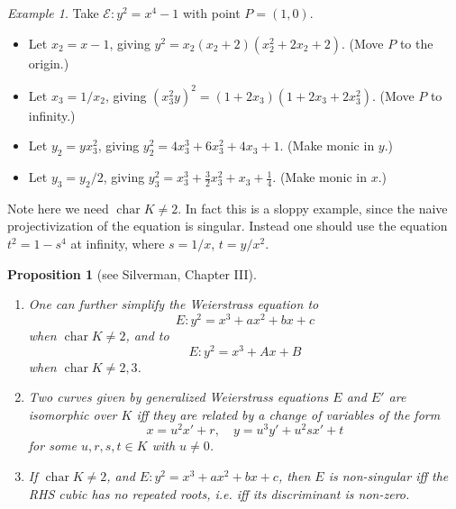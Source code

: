 \documentclass[a4paper]{article}
\theoremstyle{plain}
\newtheorem{proposition}[theorem]{Proposition}
\theoremstyle{remark}
\newtheorem*{example}{Example}
\theoremstyle{definition}
\DeclareMathOperator{\ch}{char}
\newcommand{\E}{\mathcal{E}}
\begin{document}
\begin{example}
    Take $\E:y^2=x^4-1$ with point $P=(1,0)$.
    \begin{itemize}
        \item Let $x_2=x-1$, giving $y^2=x_2(x_2+2)(x_2^2+2x_2+2)$. (Move $P$ to
            the origin.)
        \item Let $x_3=1/x_2$, giving $(x_3^2y)^2=(1+2x_3)(1+2x_3+2x_3^2)$.
            (Move $P$ to infinity.)
        \item Let $y_2=yx_3^2$, giving $y_2^2=4x_3^3+6x_3^2+4x_3+1$. (Make monic
            in $y$.)
        \item Let $y_3=y_2/2$, giving $y_3^2=x_3^3+\frac{3}{2}x_3^2+x_3+\frac{1}{4}$.
            (Make monic in $x$.)
    \end{itemize}
    Note here we need $\ch K\ne2$. In fact this is a sloppy example, since the
    naive projectivization of the equation is singular. Instead one should
    use the equation $t^2=1-s^4$ at infinity, where $s=1/x$, $t=y/x^2$.
\end{example}

\begin{proposition}[see Silverman, Chapter III]
    ~
    \begin{enumerate}[label=(\roman*)]
        \item One can further simplify the Weierstrass equation to
            \begin{equation*}
                E : y^2 = x^3 + ax^2 + bx + c
            \end{equation*}
            when $\ch K\ne2$, and to
            \begin{equation*}
                E : y^2 = x^3 + Ax + B
            \end{equation*}
            when $\ch K\ne2,3$.

        \item Two curves given by generalized Weierstrass equations $E$ and $E'$
            are isomorphic over $K$ iff they are related by a change of
            variables of the form
            \begin{equation*}
                x=u^2x'+r,\quad y=u^3y'+u^2sx'+t
            \end{equation*}
            for some $u,r,s,t\in K$ with $u\ne0$.

        \item If $\ch K\ne2$, and $E:y^2=x^3+ax^2+bx+c$, then $E$ is
            non-singular iff the RHS cubic has no repeated roots, i.e. iff its
            discriminant is non-zero.
    \end{enumerate}
\end{proposition}
\end{document}
